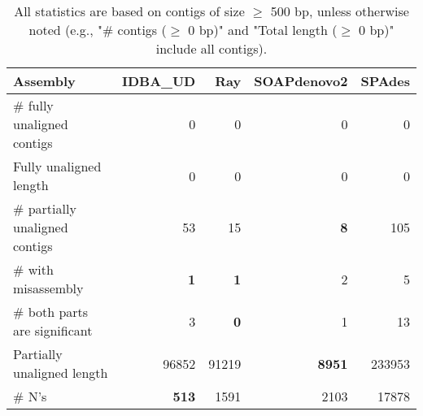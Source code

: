 \documentclass[12pt,a4paper]{article}
\begin{document}
\begin{table}[ht]
\begin{center}
\caption{All statistics are based on contigs of size $\geq$ 500 bp, unless otherwise noted (e.g., "\# contigs ($\geq$ 0 bp)" and "Total length ($\geq$ 0 bp)" include all contigs).}
\begin{tabular}{|l*{4}{|r}|}
\hline
Assembly & IDBA\_UD & Ray & SOAPdenovo2 & SPAdes \\ \hline
\# fully unaligned contigs & 0 & 0 & 0 & 0 \\ \hline
Fully unaligned length & 0 & 0 & 0 & 0 \\ \hline
\# partially unaligned contigs & 53 & 15 & {\bf 8} & 105 \\ \hline
\hspace{5mm}\# with misassembly & {\bf 1} & {\bf 1} & 2 & 5 \\ \hline
\hspace{5mm}\# both parts are significant & 3 & {\bf 0} & 1 & 13 \\ \hline
Partially unaligned length & 96852 & 91219 & {\bf 8951} & 233953 \\ \hline
\# N's & {\bf 513} & 1591 & 2103 & 17878 \\ \hline
\end{tabular}
\end{center}
\end{table}
\end{document}
